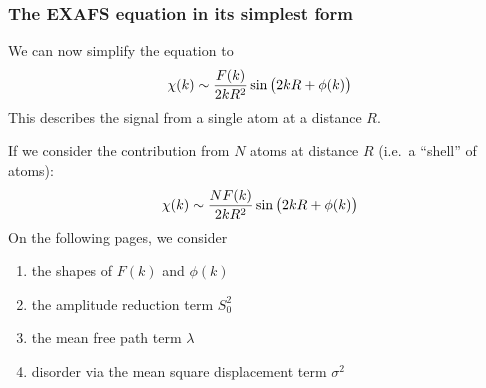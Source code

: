 \documentclass[10pt, xcolor=x11names, compress]{beamer}
\begin{document}
\begin{frame}
  \frametitle{The EXAFS equation in its simplest form}
  We can now simplify the equation to
  \begin{equation}
    \chi(k) \sim \frac{F(k)}{2kR^2}\sin\big(2kR+\phi(k)\big)
    \notag
  \end{equation}
  This describes the signal from a single atom at a distance $R$.

  \medskip

  If we consider the contribution from $N$ atoms at distance $R$
  (i.e.\ a ``shell'' of atoms):
  \begin{equation}
    \chi(k) \sim \frac{NF(k)}{2kR^2}\sin\big(2kR+\phi(k)\big)
    \notag
  \end{equation}
  On the following pages, we consider
  \begin{enumerate}
  \item the shapes of $F(k)$ and $\phi(k)$
  \item the amplitude reduction term $S_0^2$
  \item the mean free path term $\lambda$
  \item disorder via the mean square displacement term $\sigma^2$
  \end{enumerate}
\end{frame}
\end{document}

